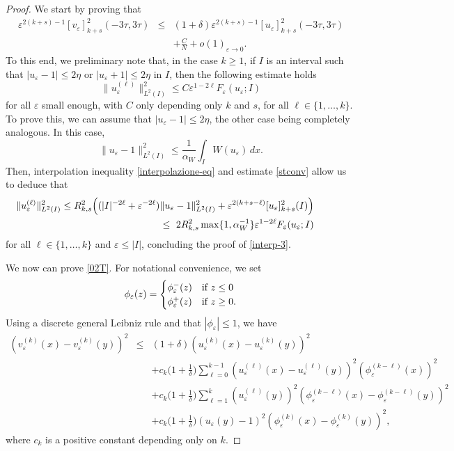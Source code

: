 \documentclass{article}
\newcommand{\e}{\varepsilon}
\begin{document}
\begin{proof}
We start by proving that %
\begin{eqnarray}\label{02T} 
\e^{2(k+s)-1}[v_\e]^2_{k+s}(-3\tau,3\tau)&\leq&(1+\delta)\e^{2(k+s)-1}[u_\e]^2_{k+s}(-3\tau,3\tau)\nonumber \\
&&+\frac{C}{N}+o(1)_{\e\to 0}. 
\end{eqnarray}
To this end, we preliminary note that, in the case $k\geq 1$, if $I$ is an interval such that $|u_\e-1|\leq 2\eta$ or  $|u_\e+1|\leq 2\eta$ in $I$, then the following estimate holds 
\begin{equation}\label{interp-3}
\|u_\e^{(\ell)}\|^2_{L^2(I)}\leq C\e^{1-2\ell} F_{\e}(u_\e;I) 
\end{equation}
for all $\e$ small enough, with $C$ only depending only $k$ and $s$, for all $\ell\in \{1,\dots, k\}$. To prove this, we can assume that $|u_\e-1|\leq 2\eta$, the other case being completely analogous. In this case, 
\begin{equation}\label{l2}
\|u_\e-1\|^2_{L^2(I)}\leq \frac{1}{\alpha_W}\int_I W(u_\e)\, dx.  
\end{equation} 
Then, interpolation inequality \eqref{interpolazione-eq} and estimate \eqref{stconv} 
allow us to deduce that 
\begin{eqnarray*}
&&\hskip-1.5cm\|u_\e^{(\ell)}\|^2_{L^2(I)}\leq R^2_{k,s}\Big((|I|^{-2\ell}+\e^{-2\ell})\|u_\e-1\|^2_{L^2(I)}+\e^{2(k+s-\ell)}[u_\e]^2_{k+s}(I)\Big) \\
&&\ \ \leq\ 2R^2_{k,s}\max\{1,\alpha_W^{-1}\} \e^{1-2\ell} F_{\e}(u_\e;I)
\end{eqnarray*} 
for all $\ell\in \{1,\dots, k\}$ and $\e\leq |I|$, concluding the proof of \eqref{interp-3}.     

We now can prove \eqref{02T}. For notational convenience, we set
$$\phi_\e(z)=\begin{cases}
\phi_\e^{-}(z) & \hbox{\rm if } z\leq 0\\
\phi_\e^{+}(z) & \hbox{\rm if } z\geq 0.
\end{cases}$$ 
Using a discrete general Leibniz rule and that $|\phi_\e|\leq 1$, we have
\begin{eqnarray}\label{v+}
(v_\e^{(k)}(x)-v_\e^{(k)}(y))^2&\leq& (1+\delta)(u_\e^{(k)}(x)-u_\e^{(k)}(y))^2
\nonumber\\
&&+c_k\Big(1+\frac{1}{\delta}\Big)\sum_{\ell=0}^{k-1}(u_\e^{(\ell)}(x)-u_\e^{(\ell)}(y))^2
(\phi_\e^{(k-\ell)}(x))^2\nonumber\\
&&+c_k\Big(1+\frac{1}{\delta}\Big)\sum_{\ell=1}^{k}(u_\e^{(\ell)}(y))^2
(\phi_\e^{(k-\ell)}(x)-\phi_\e^{(k-\ell)}(y))^2\nonumber\\
&&+c_k\Big(1+\frac{1}{\delta}\Big)(u_\e(y)-1)^2
(\phi_\e^{(k)}(x)-\phi_\e^{(k)}(y))^2,
\end{eqnarray}
where $c_k$ is a positive constant depending only on $k$.




\end{proof}
\end{document}
